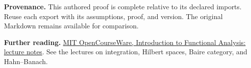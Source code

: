 \documentclass[preprint,12pt,aps,pra,showkeys,amsmath,amssymb,superscriptaddress,floatfix]{revtex4-2}
\theoremstyle{definition}
\theoremstyle{remark}
\begin{document}
\par\medskip\begingroup\small\linespread{1.0}\selectfont\noindent\textbf{Provenance.} This authored proof is complete relative to its declared imports. Reuse
each export with its assumptions, proof, and version. The original
Markdown remains available for comparison.
\par\endgroup

\par\smallskip\begingroup\small\linespread{1.0}\selectfont\noindent\textbf{Further reading.} \href{https://ocw.mit.edu/courses/18-102-introduction-to-functional-analysis-spring-2021/resources/lecture-notes/}{MIT
OpenCourseWare, Introduction to Functional Analysis: lecture notes}. See
the lectures on integration, Hilbert spaces, Baire category, and
Hahn--Banach.\par\endgroup
\end{document}

